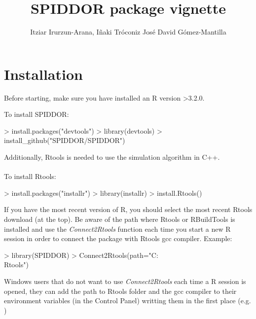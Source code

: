 \documentclass[a4paper]{article}
\title{SPIDDOR package vignette}
\author{Itziar Irurzun-Arana, I\~naki Tr\'oconiz Jos\'e David G\'omez-Mantilla}
\begin{document}


\maketitle
\tableofcontents
\clearpage

\section{Installation}
Before starting, make sure you have installed an R version >3.2.0. 

To install SPIDDOR:
\begin{Schunk}
\begin{Sinput}
> install.packages("devtools")
> library(devtools)
> install_github("SPIDDOR/SPIDDOR")
\end{Sinput}
\end{Schunk}

Additionally, Rtools is needed to use the simulation algorithm in C++.\\
\\
To install Rtools:
\begin{Schunk}
\begin{Sinput}
> install.packages("installr")
> library(installr)
> install.Rtools() 
\end{Sinput}
\end{Schunk}
If you have the most recent version of R, you should select the most recent Rtools download (at the top).
Be aware of the path where Rtools or RBuildTools is installed and use the \emph{Connect2Rtools} function each time you start a new R session in order to connect the package with Rtools gcc compiler. Example:
\begin{Schunk}
\begin{Sinput}
> library(SPIDDOR)
> Connect2Rtools(path="C:\\Rtools")
\end{Sinput}
\end{Schunk}

Windows users that do not want to use \emph{Connect2Rtools} each time a R session is opened, they can add the path to Rtools folder and the gcc compiler to their environment variables (in the Control Panel) writting them in the first place (e.g. )
\end{document}
